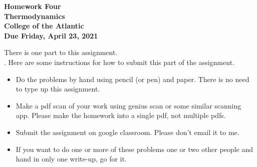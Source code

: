 \documentclass[12pt]{article}
\begin{document}
\pagestyle{empty}
 
\begin{center}
{\LARGE {\bf Homework Four}}\\
\bigskip
{\Large {\bf Thermodynamics}}\\
\bigskip
{\Large {\bf College of the Atlantic}}\\
\bigskip
{ {\bf Due Friday, April 23, 2021}}\\ 
\end{center}
\medskip


\noindent There is one part to this assignment.\\


.  Here are some
instructions for how to submit this part of the assignment.
\begin{itemize}
  \setlength{\itemsep}{1mm}
\item Do the problems by hand using pencil (or pen) and paper.
  There is no need to type up this assignment.
\item Make a pdf scan of your work using genius scan or some
  similar scanning app.  Please make the homework into a single
  pdf, not multiple pdfs.
\item Submit the assignment on google classroom.  Please don't
  email it to me. 
\item If you want to do one or more of these problems one or two other
  people and hand in only one write-up, go for it. 
\end{itemize}
\end{document}
